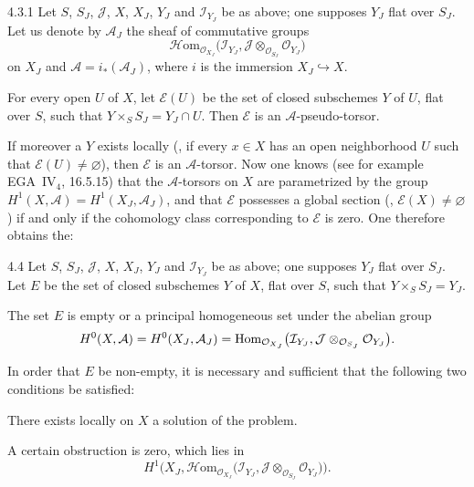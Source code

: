 \begin{corollary}{4.3.1}\label{III.4.3.1}
Let \(S\), \(S_{J}\), \(\mathcal{J}\), \(X\), \(X_{J}\), \(Y_{J}\) and
\(\mathcal{I}_{Y_{J}}\) be as above; one supposes \(Y_{J}\) flat over
\(S_{J}\). Let us denote by \(\mathcal{A}_{J}\) the sheaf of commutative
groups
\[
\mathcal{H}\mathrm{om}_{\mathcal{O}_{X_{J}}}\bigl(\mathcal{I}_{Y_{J}},
  \mathcal{J}\otimes_{\mathcal{O}_{S_{J}}}\mathcal{O}_{Y_{J}}\bigr)
\]
on \(X_{J}\) and \(\mathcal{A}=i_{*}(\mathcal{A}_{J})\), where \(i\) is the
immersion \(X_{J}\hookrightarrow X\).

For every open \(U\) of \(X\), let \(\mathcal{E}(U)\) be the set of closed
subschemes \(Y\) of \(U\), flat over \(S\), such that
\(Y\times_{S}S_{J}=Y_{J}\cap U\). Then \(\mathcal{E}\) is an
\(\mathcal{A}\)-pseudo-torsor.
\end{corollary}

If moreover a \(Y\) exists locally (\ie, if every \(x\in X\) has an open
neighborhood \(U\) such that \(\mathcal{E}(U)\neq\varnothing\)), then
\(\mathcal{E}\) is an \(\mathcal{A}\)-torsor. Now one knows (see for example
EGA~IV\(_{4}\), 16.5.15) that the \(\mathcal{A}\)-torsors on \(X\) are
parametrized by the group
\(H^{1}(X,\mathcal{A})=H^{1}(X_{J},\mathcal{A}_{J})\), and that
\(\mathcal{E}\) possesses a global section (\ie,
\(\mathcal{E}(X)\neq\varnothing\)) if and only if the cohomology class
corresponding to \(\mathcal{E}\) is zero. One therefore obtains the:

\begin{corollary}{4.4}\label{III.4.4}
Let \(S\), \(S_{J}\), \(\mathcal{J}\), \(X\), \(X_{J}\), \(Y_{J}\) and
\(\mathcal{I}_{Y_{J}}\) be as above; one supposes \(Y_{J}\) flat over
\(S_{J}\). Let \(E\) be the set of closed subschemes \(Y\) of \(X\), flat
over \(S\), such that \(Y\times_{S}S_{J}=Y_{J}\).
\begin{enumeratei}
\item The set \(E\) is empty or a principal homogeneous set under the
abelian group
\[
H^{0}(X,\mathcal{A})
  =H^{0}(X_{J},\mathcal{A}_{J})
  =\operatorname{Hom}_{\mathcal{O}_{X_{J}}}\bigl(\mathcal{I}_{Y_{J}},
    \mathcal{J}\otimes_{\mathcal{O}_{S_{J}}}\mathcal{O}_{Y_{J}}\bigr).
\]
\item In order that \(E\) be non-empty, it is necessary and sufficient that
the following two conditions be satisfied:
\begin{enumeratea}
\item There exists locally on \(X\) a solution of the problem.
\item A certain obstruction is zero, which lies in
\[
H^{1}\bigl(X_{J},
  \mathcal{H}\mathrm{om}_{\mathcal{O}_{X_{J}}}\bigl(\mathcal{I}_{Y_{J}},
    \mathcal{J}\otimes_{\mathcal{O}_{S_{J}}}\mathcal{O}_{Y_{J}}\bigr)\bigr).
\]
\end{enumeratea}
\end{enumeratei}
\end{corollary}

